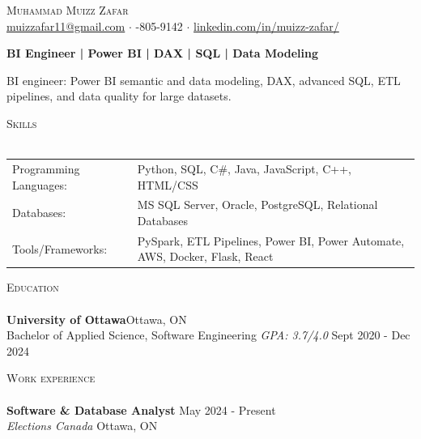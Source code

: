 \documentclass[a4paper]{article}
\newcommand{\lineunder} {
    \vspace*{-8pt} \\
    \hspace*{-18pt} \hrulefill \\
}
\newcommand{\header} [1] {
    {\hspace*{-18pt}\vspace*{6pt} \textsc{#1}}
    \vspace*{-6pt} \lineunder
}
\begin{document}
\vspace*{-40pt}
\vspace*{-10pt}
\begin{center}
	{\Huge \scshape {Muhammad Muizz Zafar}}\\
	\faSend \space \href{mailto:muizzafar11@gmail.com}{muizzafar11@gmail.com} $\cdot$ \faPhoneSquare {}-805-9142 $\cdot$ \faLinkedinSquare \space \href{https://www.linkedin.com/in/muizz-zafar/}{linkedin.com/in/muizz-zafar/}
	\\
\end{center}
\vspace{-5pt}
\begin{center}
\textbf{BI Engineer | Power BI | DAX | SQL | Data Modeling}
\end{center}
\begin{center}
BI engineer: Power BI semantic and data modeling, DAX, advanced SQL, ETL pipelines, and data quality for large datasets.
\end{center}
\header{Skills}
\begin{tabular}{ l l }
	Programming Languages:        & Python, SQL, C\#, Java, JavaScript, C++, HTML/CSS \\
	Databases:                    & MS SQL Server, Oracle, PostgreSQL, Relational Databases \\
	Tools/Frameworks:             & PySpark, ETL Pipelines, Power BI, Power Automate, AWS, Docker, Flask, React \\
\end{tabular}
\vspace{2mm}
\header{Education}
\textbf{University of Ottawa}\hfill Ottawa, ON\\
Bachelor of Applied Science, Software Engineering \textit{GPA: 3.7/4.0} \hfill Sept 2020 - Dec 2024\\
\vspace{2mm}
\header{Work experience}
\vspace{1.5mm}
\textbf{Software \& Database Analyst} \hfill May 2024 - Present\\
\textit{Elections Canada} \hfill Ottawa, ON\\
\vspace{-2mm}
\end{document}
